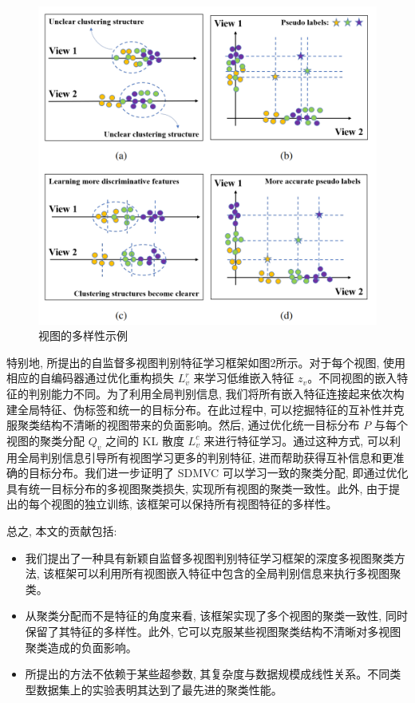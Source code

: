 \documentclass{article}
\begin{document}
\begin{figure}[h]
    \centering
    \includegraphics[width=0.75\linewidth]{./imgs/img1.png}
    \caption{视图的多样性示例}
\end{figure}


特别地, 所提出的自监督多视图判别特征学习框架如图2所示。对于每个视图, 使用相应的自编码器通过优化重构损失 \(L_v^r\) 来学习低维嵌入特征 \(z_v\)。不同视图的嵌入特征的判别能力不同。为了利用全局判别信息, 我们将所有嵌入特征连接起来依次构建全局特征、伪标签和统一的目标分布。在此过程中, 可以挖掘特征的互补性并克服聚类结构不清晰的视图带来的负面影响。然后, 通过优化统一目标分布 \(P\) 与每个视图的聚类分配 \(Q_v\) 之间的 KL 散度 \(L_v^c\) 来进行特征学习。通过这种方式, 可以利用全局判别信息引导所有视图学习更多的判别特征, 进而帮助获得互补信息和更准确的目标分布。我们进一步证明了 SDMVC 可以学习一致的聚类分配, 即通过优化具有统一目标分布的多视图聚类损失, 实现所有视图的聚类一致性。此外, 由于提出的每个视图的独立训练, 该框架可以保持所有视图特征的多样性。

总之, 本文的贡献包括:
\begin{itemize}
    \item 我们提出了一种具有新颖自监督多视图判别特征学习框架的深度多视图聚类方法, 该框架可以利用所有视图嵌入特征中包含的全局判别信息来执行多视图聚类。
    \item 从聚类分配而不是特征的角度来看, 该框架实现了多个视图的聚类一致性, 同时保留了其特征的多样性。此外, 它可以克服某些视图聚类结构不清晰对多视图聚类造成的负面影响。
    \item 所提出的方法不依赖于某些超参数, 其复杂度与数据规模成线性关系。不同类型数据集上的实验表明其达到了最先进的聚类性能。
\end{itemize}
\end{document}
